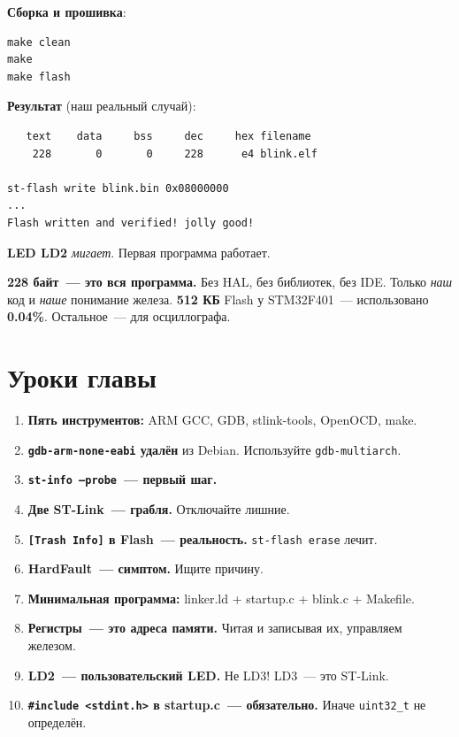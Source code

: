 \textbf{Сборка и прошивка}:

\begin{verbatim}
make clean
make
make flash
\end{verbatim}

\textbf{Результат} (наш реальный случай):

\begin{verbatim}
   text    data     bss     dec     hex filename
    228       0       0     228      e4 blink.elf

st-flash write blink.bin 0x08000000
...
Flash written and verified! jolly good!
\end{verbatim}

\textbf{LED LD2} \emph{мигает}. Первая программа работает.

\begin{ideabox}
\textbf{228 байт~--- это вся программа.} Без HAL,
без библиотек, без IDE. Только \emph{наш} код
и \emph{наше} понимание железа. \textbf{512 КБ}
Flash у STM32F401~--- использовано \textbf{0.04\%}.
Остальное~--- для осциллографа.
\end{ideabox}

\section{Уроки главы}
\label{sec:flashing-lessons}

\begin{enumerate}
    \item \textbf{Пять инструментов:} ARM GCC, GDB,
          stlink-tools, OpenOCD, make.
    \item \textbf{\texttt{gdb-arm-none-eabi} удалён}
          из Debian. Используйте \texttt{gdb-multiarch}.
    \item \textbf{\texttt{st-info --probe}~--- первый шаг.}
    \item \textbf{Две ST-Link~--- грабля.} Отключайте лишние.
    \item \textbf{\texttt{[Trash Info]} в Flash~---
          реальность.} \texttt{st-flash erase} лечит.
    \item \textbf{HardFault~--- симптом.} Ищите причину.
    \item \textbf{Минимальная программа:} linker.ld +
          startup.c + blink.c + Makefile.
    \item \textbf{Регистры~--- это адреса памяти.} Читая
          и записывая их, управляем железом.
    \item \textbf{LD2~--- пользовательский LED.} Не LD3!
          LD3~--- это ST-Link.
    \item \textbf{\texttt{\#include <stdint.h>} в startup.c~---
          обязательно.} Иначе \texttt{uint32\_t} не определён.
\end{enumerate}

